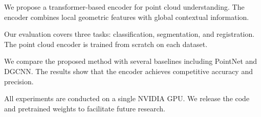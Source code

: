 We propose a transformer-based encoder for point cloud understanding. The encoder combines local geometric features with global contextual information.

Our evaluation covers three tasks: classification, segmentation, and registration. The point cloud encoder is trained from scratch on each dataset.

We compare the proposed method with several baselines including PointNet and DGCNN. The results show that the encoder achieves competitive accuracy and precision.

All experiments are conducted on a single NVIDIA GPU. We release the code and pretrained weights to facilitate future research.
